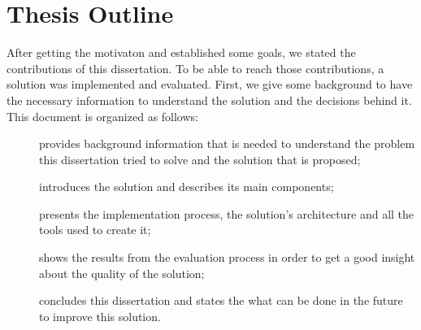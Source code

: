 \section{Thesis Outline}
\label{sec:introduction_thesis_outline}
After getting the motivaton and established some goals, we stated the contributions of this dissertation.
To be able to reach those contributions, a solution was implemented and evaluated.
First, we give some background to have the necessary information to understand the solution and the decisions behind it.
This document is organized as follows:
\begin{description}
  \item[]
  provides background information that is needed to understand the problem this dissertation tried to solve and the solution that is proposed;
  \item[]
  introduces the solution and describes its main components;
  \item[]
  presents the implementation process, the solution's architecture and all the tools used to create it;
  \item[]
  shows the results from the evaluation process in order to get a good insight about the quality of the solution;
  \item[]
  concludes this dissertation and states the what can be done in the future to improve this solution.
\end{description}
